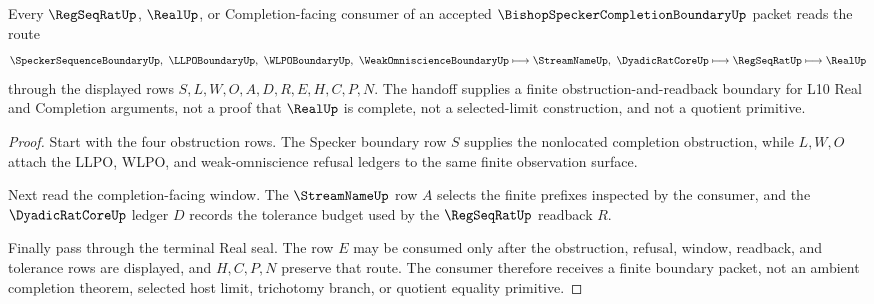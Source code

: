 \begin{theorem}
\label{thm:bishop-specker-completion-boundary-finite-window}
Every $\RegSeqRatUp$, $\RealUp$, or Completion-facing consumer of an accepted $\BishopSpeckerCompletionBoundaryUp$ packet reads the route
$$
\SpeckerSequenceBoundaryUp,\ \LLPOBoundaryUp,\ \WLPOBoundaryUp,\ \WeakOmniscienceBoundaryUp
\longmapsto
\StreamNameUp,\ \DyadicRatCoreUp
\longmapsto
\RegSeqRatUp
\longmapsto
\RealUp
$$
through the displayed rows $S,L,W,O,A,D,R,E,H,C,P,N$. The handoff supplies a finite obstruction-and-readback boundary for L10 Real and Completion arguments, not a proof that $\RealUp$ is complete, not a selected-limit construction, and not a quotient primitive.
\end{theorem}
\begin{proof}
Start with the four obstruction rows. The Specker boundary row $S$ supplies the nonlocated completion obstruction, while $L,W,O$ attach the LLPO, WLPO, and weak-omniscience refusal ledgers to the same finite observation surface.

Next read the completion-facing window. The $\StreamNameUp$ row $A$ selects the finite prefixes inspected by the consumer, and the $\DyadicRatCoreUp$ ledger $D$ records the tolerance budget used by the $\RegSeqRatUp$ readback $R$.

Finally pass through the terminal Real seal. The row $E$ may be consumed only after the obstruction, refusal, window, readback, and tolerance rows are displayed, and $H,C,P,N$ preserve that route. The consumer therefore receives a finite boundary packet, not an ambient completion theorem, selected host limit, trichotomy branch, or quotient equality primitive.
\end{proof}

